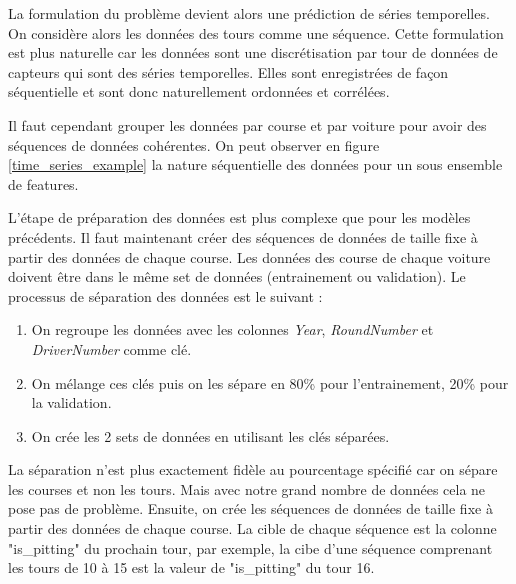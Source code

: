 La formulation du problème devient alors une prédiction de séries temporelles.
On considère alors les données des tours comme une séquence.
Cette formulation est plus naturelle car les données sont une discrétisation par tour de données de capteurs qui sont des séries temporelles.
Elles sont enregistrées de façon séquentielle et sont donc naturellement ordonnées et corrélées.

Il faut cependant grouper les données par course et par voiture pour avoir des séquences de données cohérentes.
On peut observer en figure \ref{time_series_example} la nature séquentielle des données pour un sous ensemble de features.

L'étape de préparation des données est plus complexe que pour les modèles précédents.
Il faut maintenant créer des séquences de données de taille fixe à partir des données de chaque course.
Les données des course de chaque voiture doivent être dans le même set de données (entrainement ou validation).
Le processus de séparation des données est le suivant :
\begin{enumerate}
    \item On regroupe les données avec les colonnes \textit{Year}, \textit{RoundNumber} et \textit{DriverNumber} comme clé.
    \item On mélange ces clés puis on les sépare en 80\% pour l'entrainement, 20\% pour la validation.
    \item On crée les 2 sets de données en utilisant les clés séparées.
\end{enumerate}
La séparation n'est plus exactement fidèle au pourcentage spécifié car on sépare les courses et non les tours.
Mais avec notre grand nombre de données cela ne pose pas de problème.
Ensuite, on crée les séquences de données de taille fixe à partir des données de chaque course.
La cible de chaque séquence est la colonne "is\_pitting" du prochain tour,
par exemple, la cibe d'une séquence comprenant les tours de 10 à 15 est la valeur de "is\_pitting" du tour 16.

